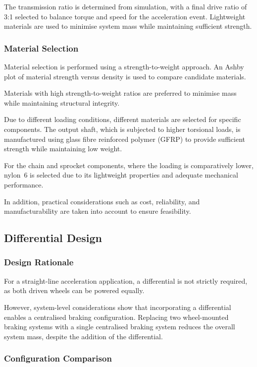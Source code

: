 \documentclass[a4paper,12pt]{article}
\begin{document}
The transmission ratio is determined from simulation, with a final drive ratio of 3:1 selected to balance torque and speed for the acceleration event. Lightweight materials are used to minimise system mass while maintaining sufficient strength.

\subsubsection{Material Selection}

Material selection is performed using a strength-to-weight approach. An Ashby plot of material strength versus density is used to compare candidate materials.

Materials with high strength-to-weight ratios are preferred to minimise mass while maintaining structural integrity.

Due to different loading conditions, different materials are selected for specific components. The output shaft, which is subjected to higher torsional loads, is manufactured using glass fibre reinforced polymer (GFRP) to provide sufficient strength while maintaining low weight.

For the chain and sprocket components, where the loading is comparatively lower, nylon~6 is selected due to its lightweight properties and adequate mechanical performance.

In addition, practical considerations such as cost, reliability, and manufacturability are taken into account to ensure feasibility.

\subsection{Differential Design}

\subsubsection{Design Rationale}

For a straight-line acceleration application, a differential is not strictly required, as both driven wheels can be powered equally.

However, system-level considerations show that incorporating a differential enables a centralised braking configuration. Replacing two wheel-mounted braking systems with a single centralised braking system reduces the overall system mass, despite the addition of the differential.

\subsubsection{Configuration Comparison}
\end{document}
